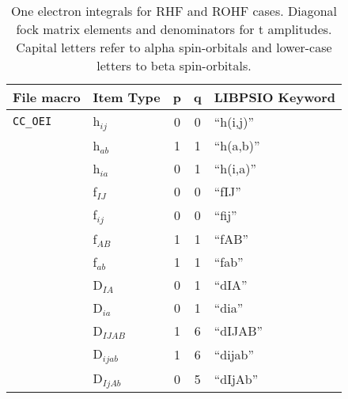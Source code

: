 \documentclass[12pt]{revtex4}
\begin{document}
\begin{table}
\squeezetable
\caption{One electron integrals for RHF and ROHF cases.  Diagonal fock 
matrix elements and denominators for t amplitudes. Capital letters refer
to alpha spin-orbitals and lower-case letters to beta spin-orbitals.}
\begin{center}
\renewcommand{\arraystretch}{0.95}
\begin{tabular}{llccl}
File macro & Item Type & p & q & LIBPSIO Keyword \\
\hline
{\tt CC\_OEI} &h$_{ij}$ & 0 & 0 & ``h(i,j)'' \\
              &h$_{ab}$ & 1 & 1 & ``h(a,b)'' \\
              &h$_{ia}$ & 0 & 1 & ``h(i,a)'' \\
              &f$_{IJ}$ & 0 & 0 & ``fIJ'' \\
              &f$_{ij}$ & 0 & 0 & ``fij'' \\
              &f$_{AB}$ & 1 & 1 & ``fAB'' \\
              &f$_{ab}$ & 1 & 1 & ``fab'' \\
              &D$_{IA}$ & 0 & 1 & ``dIA'' \\
              &D$_{ia}$ & 0 & 1 & ``dia'' \\
              &D$_{IJAB}$ & 1 & 6 & ``dIJAB'' \\
              &D$_{ijab}$ & 1 & 6 & ``dijab'' \\
              &D$_{IjAb}$ & 0 & 5 & ``dIjAb'' \\
\end{tabular}
\end{center}
\end{table}
\end{document}

